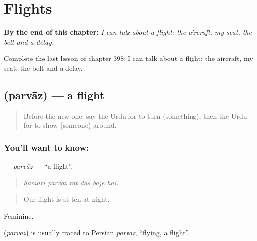 
\chapter{Flights}
\label{ch:ur-flights}

\begin{chapteropening}
\textbf{By the end of this chapter:} \emph{I can talk about a flight: the aircraft, my seat, the belt and a delay.}

Complete the last lesson of chapter 398: I can talk about a flight: the aircraft, my seat, the belt and a delay.
\end{chapteropening}

\section[\texorpdfstring{\ur{پرواز} (parvāz)}{پرواز (parvāz)}]{ (parvāz) — a flight}

\label{lesson:UR-C398-parvaz}



\begin{quote}
Before the new one: say the Urdu for to turn (something), then the Urdu for to show (someone) around.
\end{quote}

\subsection*{You'll want to know: }
\textbf{} — \emph{parvāz} — \textquotedblleft{}a flight\textquotedblright{}.

\begin{quote}
     
\end{quote}

\begin{quote}
\emph{hamārī parvāz rāt das baje hai.}
\end{quote}

\begin{quote}
Our flight is at ten at night.
\end{quote}

Feminine.

\begin{cousinweb}
\textbf{} (\emph{parvāz}) is usually traced to Persian \emph{parvāz}, \textquotedblleft{}flying, a flight\textquotedblright{}.
\end{cousinweb}

